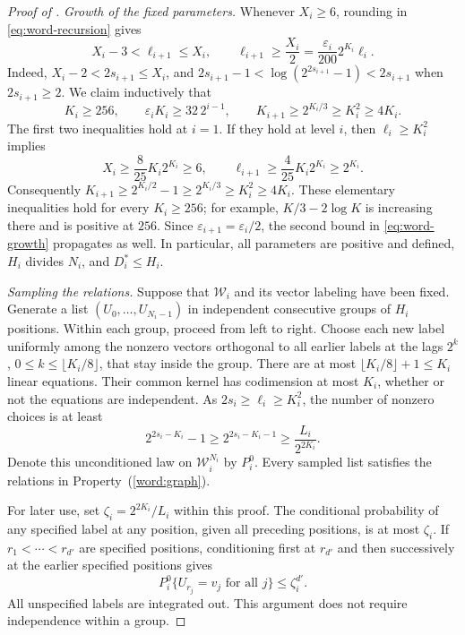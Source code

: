 \begin{proof}[Proof of ]
\emph{Growth of the fixed parameters.}
Whenever $X_i\ge6$, rounding in \eqref{eq:word-recursion} gives
\begin{equation}\label{eq:word-rounding}
  X_i-3<\ell_{i+1}\le X_i,\qquad
  \ell_{i+1}\ge\frac{X_i}{2}
       =\frac{\varepsilon_i}{200}2^{K_i}\ell_i.
\end{equation}
Indeed, $X_i-2<2s_{i+1}\le X_i$, and
$2s_{i+1}-1<\log(2^{2s_{i+1}}-1)<2s_{i+1}$ when $2s_{i+1}\ge2$.
We claim inductively that
\begin{equation}\label{eq:word-growth}
 K_i\ge256,\qquad
 \varepsilon_iK_i\ge32\,2^{i-1},\qquad
 K_{i+1}\ge2^{K_i/3}\ge K_i^2\ge4K_i.
\end{equation}
The first two inequalities hold at $i=1$.  If they hold at level $i$,
then $\ell_i\ge K_i^2$ implies
\[
  X_i\ge\frac8{25}K_i2^{K_i}\ge6,
  \qquad
  \ell_{i+1}\ge\frac4{25}K_i2^{K_i}\ge2^{K_i}.
\]
Consequently
$K_{i+1}\ge2^{K_i/2}-1\ge2^{K_i/3}\ge K_i^2\ge4K_i$.
These elementary inequalities hold for every $K_i\ge256$;
for example, $K/3-2\log K$ is increasing there and is positive at $256$.
Since $\varepsilon_{i+1}=\varepsilon_i/2$, the second bound in
\eqref{eq:word-growth} propagates as well.  In particular, all parameters
are positive and defined, $H_i$ divides $N_i$, and $D_i^*\le H_i$.

\smallskip\noindent
\emph{Sampling the relations.}
Suppose that $\mathcal W_i$ and its vector labeling have been fixed.
Generate a list $(U_0,\ldots,U_{N_i-1})$ in independent consecutive
groups of $H_i$ positions.  Within each group, proceed from left to
right.  Choose each new label uniformly among the nonzero vectors
orthogonal to all earlier labels at the lags
$2^k$, $0\le k\le\lfloor K_i/8\rfloor$, that stay inside the group.  There are at most $\lfloor K_i/8\rfloor+1\le K_i$
linear equations.  Their common kernel has codimension at most $K_i$,
whether or not the equations are independent.  As $2s_i\ge\ell_i\ge K_i^2$,
the number of nonzero choices is at least
\begin{equation}\label{eq:word-choices}
  2^{2s_i-K_i}-1
    \ge2^{2s_i-K_i-1}
    \ge\frac{L_i}{2^{2K_i}}.
\end{equation}
Denote this unconditioned law on $\mathcal W_i^{N_i}$ by $P_i^0$.
Every sampled list satisfies the relations in Property~(\ref{word:graph}).

For later use, set $\zeta_i=2^{2K_i}/L_i$ within this proof.
The conditional probability of any specified label at any position,
given all preceding positions, is at most $\zeta_i$.
If $r_1<\cdots<r_{d'}$ are specified positions, conditioning first at
$r_{d'}$ and then successively at the earlier specified positions gives
\begin{equation}\label{eq:word-raw-sublist}
  P_i^0\{U_{r_j}=v_j\text{ for all }j\}\le\zeta_i^{d'}.
\end{equation}
All unspecified labels are integrated out.  This argument does not
require independence within a group.


\end{proof}

